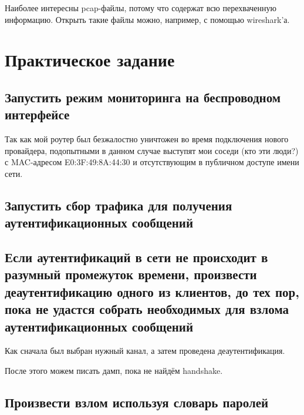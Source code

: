 \documentclass[a4paper]{article}
\begin{document}
Наиболее интересны pcap-файлы, потому что содержат всю перехваченную информацию. Открыть такие файлы можно, например, с помощью wireshark'а.

\section{Практическое задание}

\subsection{Запустить режим мониторинга на беспроводном интерфейсе}



Так как мой роутер был безжалостно уничтожен во время подключения нового провайдера, подопытными в данном случае выступят мои соседи (кто эти люди?) с MAC-адресом E0:3F:49:8A:44:30 и отсутствующим в публичном доступе имени сети.


\subsection{Запустить сбор трафика для получения аутентификационных сообщений}



\subsection{Если аутентификаций в сети не происходит в разумный промежуток времени, произвести деаутентификацию одного из клиентов, до тех пор, пока не удастся собрать необходимых для взлома аутентификационных сообщений}



Как сначала был выбран нужный канал, а затем проведена деаутентификация.

После этого можем писать дамп, пока не найдём handshake.



\subsection{Произвести взлом используя словарь паролей}


\end{document}
